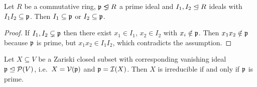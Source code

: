 % 
% 




\begin{lemma}
  \label{lemma: trivial prime avoidance}
  Let $R$ be a commutative ring, $\mf{p} \idealneq R$ a prime ideal and $I_1, I_2 \trianglelefteq R$ ideals with $I_1 I_2 \subseteq \mathfrak{p}$.
  Then $I_1 \subseteq \mathfrak{p}$ or $I_2 \subseteq \mathfrak{p}$.
\end{lemma}

\begin{proof}
  If $I_1, I_2 \subsetneq \mathfrak{p}$ then there exist $x_1 \in I_1$, $x_2 \in I_2$ with $x_i \notin \mathfrak{p}$.
  Then $x_1 x_2 \notin \mathfrak{p}$ because $\mathfrak{p}$ is prime, but $x_1 x_2 \in I_1 I_2$, which contradicts the assumption.
\end{proof}


\begin{lemma}
  Let $X \subseteq V$ be a Zariski closed subset with corresponding vanishing ideal $\mathfrak{p} \trianglelefteq \mathcal{P}(V)$, i.e.\ $X = \mathcal{V}(\mathfrak{p})$ and $\mathfrak{p} = \mathcal{I}(X)$.
  Then $X$ is irreducible if and only if $\mathfrak{p}$ is prime.
\end{lemma}


